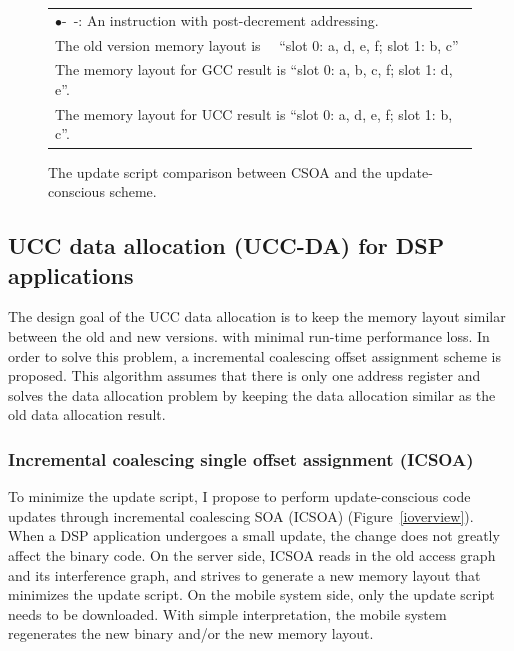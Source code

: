 \begin{figure}[htbp]
\begin{small}
\begin{center}
\begin{tabular}{|c|c||l||l|l||l|l|}
\multicolumn{7}{l}{$\bullet$-~-: An instruction with post-decrement addressing.}\\
\multicolumn{7}{l}{The old version memory layout is ~~``slot 0: a, d, e, f; slot 1: b, c''}\\
\multicolumn{7}{l}{The memory layout for GCC result is ``slot 0: a, b, c, f; slot 1: d, e''.}\\
\multicolumn{7}{l}{The memory layout for UCC result is ``slot 0: a, d, e, f; slot 1: b, c''.}
\end{tabular}
\end{center}
\end{small}
\caption{The update script comparison between CSOA and the update-conscious scheme.}
\vspace{-0.2in}
\label{recomdiff}
\end{figure}





\subsection{UCC data allocation (UCC-DA) for DSP applications}
The design goal of the UCC data allocation is to keep the memory layout similar between the old and new versions.
with minimal run-time performance loss.
In order to solve this problem, a incremental coalescing offset assignment scheme is proposed. This algorithm 
assumes that there is only one address register and solves the data allocation problem
by keeping the data allocation similar as the old data allocation result.


\subsubsection{Incremental coalescing single offset assignment (ICSOA)}


To minimize the update script, I propose to perform update-conscious code updates through incremental coalescing SOA 
(ICSOA) (Figure~\ref{ioverview}). When a DSP application undergoes a small update, the change does not greatly affect 
the binary code. On the server side, ICSOA reads in the old access graph and its interference graph, and strives to 
generate a new memory layout that minimizes the update script. On the mobile system side, only the update script needs 
to be downloaded. With simple interpretation, the mobile system  regenerates the new binary and/or the new memory 
layout.


